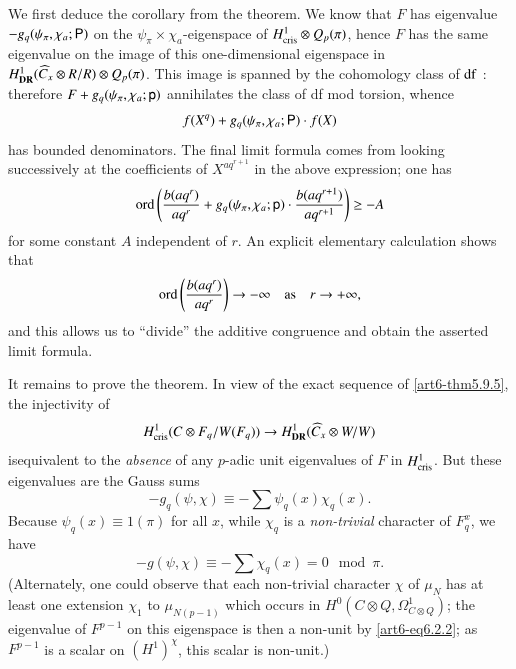 We first deduce the corollary from the theorem. We know that $F$ has eigenvalue $-g_{q}(\psi_{\pi},\chi_{a};\mathsf{P})$ on the $\psi_{\pi}\times \chi_{a}$-eigenspace of $H^{1}_{\operatorname{cris}}\otimes Q_{p}(\pi)$, hence $F$ has the same eigenvalue on the image of this one-dimensional eigenspace in $H^{1}_{\mathbf{DR}}(\widehat{C}_{x}\otimes R/R)\otimes Q_{p}(\pi)$. This image is spanned by the cohomology class of $\operatorname{df}$ : therefore $F+g_{q}(\psi_{\pi},\chi_{a};\mathsf{p})$ annihilates the class of df mod torsion, whence
$$
f(X^{q})+g_{q}(\psi_{\pi},\chi_{a};\mathsf{P})\cdot f(X)
$$
has bounded denominators. The final limit formula comes from looking successively at the coefficients of $X^{aq^{r+1}}$ in the above expression; one has
$$
\operatorname{ord}\left(\frac{b(aq^{r})}{aq^{r}}+g_{q}(\psi_{\pi},\chi_{a};\mathsf{p})\cdot \frac{b(aq^{r+1})}{aq^{r+1}}\right)\geq -A
$$
for some constant $A$ independent of $r$. An explicit elementary calculation shows that
$$
\operatorname{ord} \left(\frac{b(aq^{r})}{aq^{r}}\right)\to -\infty\quad\text{as}\quad r\to +\infty,
$$
and this allows us to ``divide'' the additive congruence and obtain the asserted limit formula.

It remains to prove the theorem. In view of the exact sequence of \eqref{art6-thm5.9.5}, the injectivity of
$$
H^{1}_{\operatorname{cris}}(C\otimes F_{q}/W(F_{q}))\to H^{1}_{\mathbf{DR}}(\widehat{C}_{x}\otimes W/W)
$$
is\pageoriginale equivalent to the {\em absence} of any $p$-adic unit eigenvalues of $F$ in $H^{1}_{\operatorname{cris}}$. But these eigenvalues are the Gauss sums
$$
-g_{q}(\psi,\chi)\equiv -\sum \psi_{q}(x)\chi_{q}(x).
$$
Because $\psi_{q}(x)\equiv 1(\pi)$ for all $x$, while $\chi_{q}$ is a {\em non-trivial} character of $F^{x}_{q}$, we have
$$
-g(\psi,\chi)\equiv -\sum \chi_{q}(x)=0\mod \pi.
$$
(Alternately, one could observe that each non-trivial character $\chi$ of $\mu_{N}$ has at least one extension $\chi_{1}$ to $\mu_{N(p-1)}$ which occurs in $H^{0}(C\otimes Q,\Omega^{1}_{C\otimes Q})$; the eigenvalue of $F^{p-1}$ on this eigenspace is then a non-unit by \eqref{art6-eq6.2.2}; as $F^{p-1}$ is a scalar on $(H^{1})^{\chi}$, this scalar is non-unit.)

